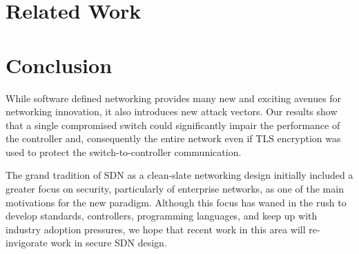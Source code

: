\documentclass[12pt, letterpaper, twocolumn, twoside]{article}
\begin{document}
\begin{spacing}{1.0}
\section{Related Work}
\label{related}


\section{Conclusion}
While software defined networking provides many new and exciting avenues for networking innovation, it also introduces new attack vectors. Our results show that a single compromised switch could significantly impair the performance of the controller and, consequently the entire network even if TLS encryption was used to protect the switch-to-controller communication. 

The grand tradition of SDN as a clean-slate networking design \cite{4d} \cite{ethane} \cite{sane} initially included a greater focus on security, particularly of enterprise networks, as one of the main motivations for the new paradigm.  Although this focus has waned in the rush to develop standards, controllers, programming languages, and keep up with industry adoption pressures, we hope that recent work in this area will re-invigorate work in secure SDN design.




\end{spacing}
\end{document}

